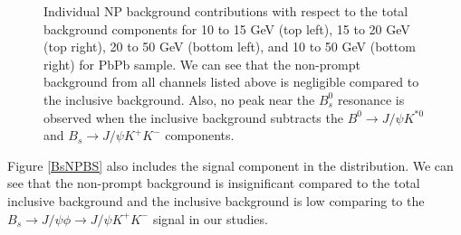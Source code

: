\begin{figure}[ht!]
\caption{Individual NP background contributions with respect to the total background components for 10 to 15 GeV (top left), 15 to 20 GeV (top right), 20 to 50 GeV (bottom left), and 10 to 50 GeV (bottom right) for PbPb sample. We can see that the non-prompt background from all channels listed above is negligible compared to the inclusive background. Also, no peak near the $B_s^0$ resonance is observed when the inclusive background subtracts the $B^0 \rightarrow J/\psi  K^{*0} $ and $B_s \rightarrow J/\psi  K^+ K^-$ components.}
\label{BsNPbkgd}
\end{figure}


Figure \ref{BsNPBS} also includes the signal component in the distribution. We can see that the non-prompt background is insignificant compared to the total inclusive background and the inclusive background is low comparing to the $B_s \rightarrow J/\psi \phi \rightarrow J/\psi K^+ K^-$ signal in our studies.
 
 
 
